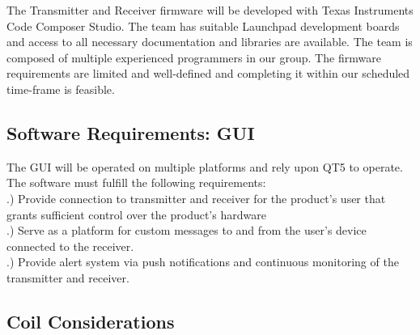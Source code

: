 \documentclass[12pt]{article}
\begin{document}
\indent
The Transmitter and Receiver firmware will be developed with Texas Instruments Code Composer Studio. The team has suitable Launchpad development boards and access to all necessary documentation and libraries are available. The team is composed of multiple experienced programmers in our group. The firmware requirements are limited and well-defined and completing it within our scheduled time-frame is feasible.

\pagebreak

\subsection{Software Requirements: GUI}

The GUI will be operated on multiple platforms and rely upon QT5 to operate.  The software must fulfill the following requirements:\\

.) Provide connection to transmitter and receiver for the product's user that grants sufficient control over the product's hardware\\

.) Serve as a platform for custom messages to and from the user's device connected to the receiver.\\

.) Provide alert system via push notifications and continuous monitoring of the transmitter and receiver.\\


\subsection{Coil Considerations}
\end{document}
